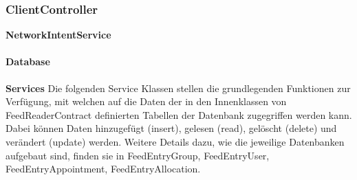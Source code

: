 \subsubsection{ClientController}

\textbf{NetworkIntentService}

\paragraph{Database}

\textbf{Services}
Die folgenden Service Klassen stellen die grundlegenden Funktionen zur Verfügung, mit welchen auf die Daten der in den Innenklassen von FeedReaderContract definierten Tabellen der Datenbank zugegriffen werden kann. Dabei können Daten hinzugefügt (insert), gelesen (read), gelöscht (delete) und verändert (update) werden.
Weitere Details dazu, wie die jeweilige Datenbanken aufgebaut sind, finden sie in FeedEntryGroup, FeedEntryUser, FeedEntryAppointment, FeedEntryAllocation.

